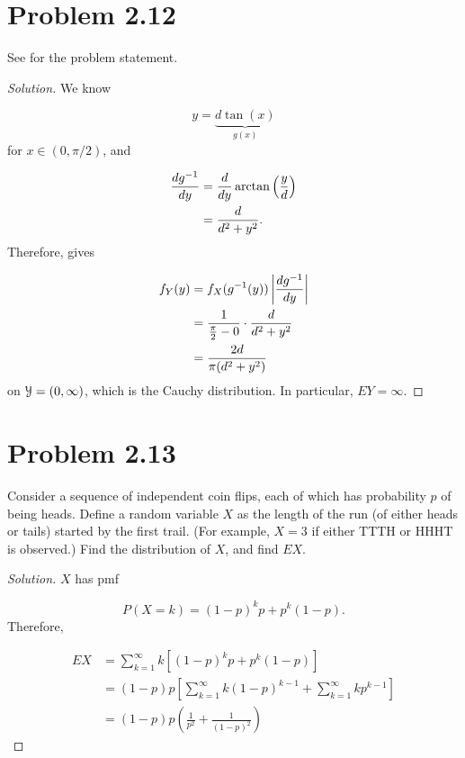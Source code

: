 \documentclass[12pt,letterpaper,reqno]{amsart}
\numberwithin{equation}{subsection}
\begin{document}
\newpage
\section{Problem 2.12} See \cite[page 77]{Berger-Casella} for the problem statement.

\begin{proof}[Solution] We know

\[ y = \underbrace{d \tan(x)}_{g(x)} \]
for $x \in (0, \pi/2)$, and

\begin{align*}
    \frac{d{g^{-1}}}{d{y}} &= \frac{d{}}{d{y}} \arctan \left( \frac{y}{d} \right) \\
                    &= \frac{d}{d^2 + y^2}.
\end{align*}
Therefore, \cite[Theorem 2.1.5 on page 51]{Berger-Casella} gives

\begin{align*}
    f_Y(y) &= f_X(g^{-1}(y)) \left\lvert{\frac{d{g^{-1}}}{d{y}}}\right\rvert \\
           &= \frac{1}{\frac{\pi}{2} - 0} \cdot \frac{d}{d^2 + y^2} \\
           &= \frac{2d}{\pi (d^2 + y^2)}
\end{align*}
on $\mathcal{{Y}} = (0, \infty)$, which is the Cauchy distribution. In particular, $EY = \infty$.
\end{proof}

\newpage
\section{Problem 2.13}

Consider a sequence of independent coin flips, each of which has probability $p$ of being heads. Define a random variable $X$ as the length of the run (of either heads or tails) started by the first trail. (For example, $X = 3$ if either TTTH or HHHT is observed.) Find the distribution of $X$, and find $EX$.

\begin{proof}[Solution] $X$ has pmf

\[ P(X = k) = (1-p)^kp + p^k(1-p). \]
Therefore,

\begin{align*}
    EX &= \sum_{k=1}^{\infty} k \left[ (1-p)^kp + p^k(1-p) \right] \\
       &= (1-p)p \left[ \sum_{k=1}^{\infty} k(1-p)^{k-1} + \sum_{k=1}^{\infty} kp^{k-1} \right] \\
       &= (1-p)p \left( \frac{1}{p^2} + \frac{1}{(1-p)^2} \right)
\end{align*}
\end{proof}
\end{document}
